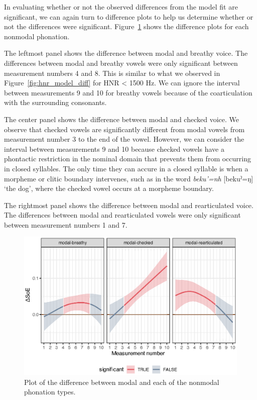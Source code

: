 In evaluating whether or not the observed differences from the model fit are significant, we can again turn to difference plots to help us determine whether or not the differences were significant. Figure~\ref{fig:soe_model_diff} shows the difference plots for each nonmodal phonation. 

The leftmost panel shows the difference between modal and breathy voice. The differences between modal and breathy vowels were only significant between measurement numbers 4 and 8. This is similar to what we observed in Figure~\ref{fig:hnr_model_diff} for HNR < 1500 Hz. We can ignore the interval between measurements 9 and 10 for breathy vowels because of the coarticulation with the surrounding consonants.

The center panel shows the difference between modal and checked voice. We observe that checked vowels are significantly different from modal vowels from measurement number 3 to the end of the vowel. However, we can consider the interval between measurements 9 and 10 because checked vowels have a phontactic restriction in the nominal domain that prevents them from occurring in closed syllables. The only time they can accure in a closed syllable is when a morpheme or clitic boundary intervenes, such as in the word \textit{beku'=nh} [bekuˀ=ŋ] `the dog', where the checked vowel occurs at a morpheme boundary. 

The rightmost panel shows the difference between modal and rearticulated voice. The differences between modal and rearticulated vowels were only significant between measurement numbers 1 and 7. 

\begin{figure}[h!]
    \centering
    \includegraphics[width = \linewidth]{images/LCH_GAMMs/soe_model_diff.eps}
    \caption{Plot of the difference between modal and each of the nonmodal phonation types.}
    \label{fig:soe_model_diff}
\end{figure}

